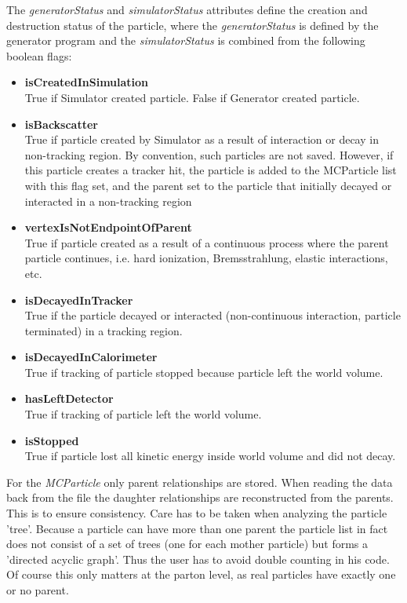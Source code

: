 \documentclass[twoside]{article}
\begin{document}
The {\em generatorStatus} and {\em simulatorStatus} attributes define the creation and destruction
status of the particle, where the  {\em generatorStatus} is defined by the generator program and
the  {\em simulatorStatus} is combined from the following boolean flags:
\begin{itemize}
\item{{\bf isCreatedInSimulation} \\
True if Simulator created particle. False if Generator created particle.}
\item{{\bf isBackscatter} \\
True if particle created by Simulator as a result of interaction or decay in non-tracking region.
By convention, such particles are not saved. However, if this particle creates a tracker hit, the particle 
is added to the MCParticle list with this flag set,  and the parent set to the particle that initially decayed or
interacted in a non-tracking region}
\item{{\bf vertexIsNotEndpointOfParent} \\
True if particle created as a result of a continuous process where the parent particle continues, i.e. 
hard ionization, Bremsstrahlung, elastic interactions, etc.}
\item{{\bf isDecayedInTracker} \\
True if the particle decayed or interacted (non-continuous interaction, particle terminated) in a tracking region.}
\item{{\bf isDecayedInCalorimeter} \\
True if tracking of particle stopped because particle left the world volume.}
\item{{\bf hasLeftDetector} \\
True if tracking of particle left the world volume.}
\item{{\bf isStopped} \\
True if particle lost all kinetic energy inside world volume and did not decay.}
\end{itemize}

For the {\em MCParticle} only parent relationships are stored. When reading the data back from the 
file the daughter relationships are reconstructed from the parents. This is to ensure consistency.
Care has to be taken when analyzing the particle 'tree'. Because a particle can have more than one 
parent the particle list in fact does not consist of a set of trees (one for each mother particle) 
but  forms a 'directed acyclic graph'. Thus the user has to avoid double counting in his code.
Of course this only matters at the parton level, as real particles have exactly one or no parent. \\
\end{document}
